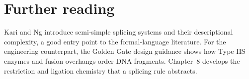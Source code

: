 \section*{Further reading}
Kari and Ng introduce semi-simple splicing systems and their descriptional
complexity, a good entry point to the formal-language literature.\cite{KariNg2019}
For the engineering counterpart, the Golden Gate design guidance shows how Type
IIS enzymes and fusion overhangs order DNA fragments.\cite{NEBGoldenGate}
Chapter~8 develops the restriction and ligation chemistry that a splicing rule
abstracts.
